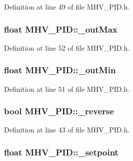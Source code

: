 \-Definition at line 49 of file \-M\-H\-V\-\_\-\-P\-I\-D.\-h.

\hypertarget{class_m_h_v___p_i_d_a0ef2b6cdafc241e3678a4c4f3efbdcec}{
\subsubsection[{\-\_\-out\-Max}]{\setlength{\rightskip}{0pt plus 5cm}float {\bf \-M\-H\-V\-\_\-\-P\-I\-D\-::\-\_\-out\-Max}}}
\label{class_m_h_v___p_i_d_a0ef2b6cdafc241e3678a4c4f3efbdcec}


\-Definition at line 52 of file \-M\-H\-V\-\_\-\-P\-I\-D.\-h.

\hypertarget{class_m_h_v___p_i_d_a1a7aba4cfb7c347428fade3e7a0f6e98}{
\subsubsection[{\-\_\-out\-Min}]{\setlength{\rightskip}{0pt plus 5cm}float {\bf \-M\-H\-V\-\_\-\-P\-I\-D\-::\-\_\-out\-Min}}}
\label{class_m_h_v___p_i_d_a1a7aba4cfb7c347428fade3e7a0f6e98}


\-Definition at line 51 of file \-M\-H\-V\-\_\-\-P\-I\-D.\-h.

\hypertarget{class_m_h_v___p_i_d_ae47baf90291256480ae57cbbc1ed917c}{
\subsubsection[{\-\_\-reverse}]{\setlength{\rightskip}{0pt plus 5cm}bool {\bf \-M\-H\-V\-\_\-\-P\-I\-D\-::\-\_\-reverse}}}
\label{class_m_h_v___p_i_d_ae47baf90291256480ae57cbbc1ed917c}


\-Definition at line 43 of file \-M\-H\-V\-\_\-\-P\-I\-D.\-h.

\hypertarget{class_m_h_v___p_i_d_a46322bf586cac91fef5c2e38f269c718}{
\subsubsection[{\-\_\-setpoint}]{\setlength{\rightskip}{0pt plus 5cm}float {\bf \-M\-H\-V\-\_\-\-P\-I\-D\-::\-\_\-setpoint}}}
\label{class_m_h_v___p_i_d_a46322bf586cac91fef5c2e38f269c718}


